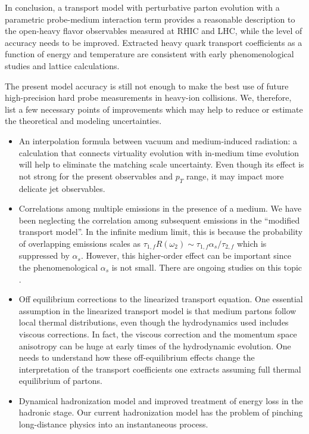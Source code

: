 In conclusion, a transport model with perturbative parton evolution with a parametric probe-medium interaction term provides a reasonable description to the open-heavy flavor observables measured at RHIC and LHC, while the level of accuracy needs to be improved.
Extracted heavy quark transport coefficients as a function of energy and temperature are consistent with early phenomenological studies and lattice calculations.

The present model accuracy is still not enough to make the best use of future high-precision hard probe measurements in heavy-ion collisions.
We, therefore, list a few necessary points of improvements which may help to reduce or estimate the theoretical and modeling uncertainties.
\begin{itemize}
\item An interpolation formula between vacuum and medium-induced radiation: a calculation that connects virtuality evolution with in-medium time evolution will help to eliminate the matching scale uncertainty. Even though its effect is not strong for the present observables and $p_T$ range, it may impact more delicate jet observables.
\item Correlations among multiple emissions in the presence of a medium. We have been neglecting the correlation among subsequent emissions in the ``modified transport model''. In the infinite medium limit, this is because the probability of overlapping emissions scales as $\tau_{1,f} R(\omega_2) \sim \tau_{1,f} \alpha_s/\tau_{2,f}$ which is suppressed by $\alpha_s$. However, this higher-order effect can be important since the phenomenological $\alpha_s$ is not small. There are ongoing studies on this topic \cite{Arnold:2015qya,Arnold:2016kek,Arnold:2016mth,Arnold:2016jnq}.
\item Off equilibrium corrections to the linearized transport equation. One essential assumption in the linearized transport model is that medium partons follow local thermal distributions, even though the hydrodynamics used includes viscous corrections. 
In fact, the viscous correction and the momentum space anisotropy can be huge at early times of the hydrodynamic evolution. 
One needs to understand how these off-equilibrium effects change the interpretation of the transport coefficients one extracts assuming full thermal equilibrium of partons.
\item Dynamical hadronization model and improved treatment of energy loss in the hadronic stage.
Our current hadronization model has the problem of pinching long-distance physics into an instantaneous process. 

\end{itemize}
